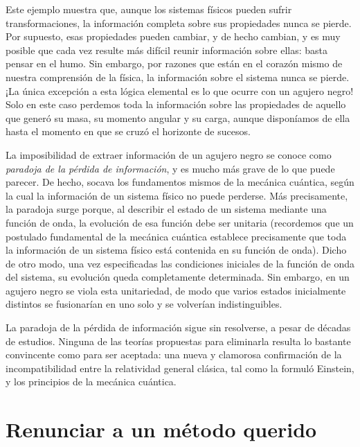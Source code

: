 Este ejemplo muestra que, aunque los sistemas físicos pueden sufrir transformaciones, la información completa sobre sus propiedades nunca se pierde. Por supuesto, esas propiedades pueden cambiar, y de hecho cambian, y es muy posible que cada vez resulte más difícil reunir información sobre ellas: basta pensar en el humo. Sin embargo, por razones que están en el corazón mismo de nuestra comprensión de la física, la información sobre el sistema nunca se pierde. ¡La única excepción a esta lógica elemental es lo que ocurre con un agujero negro! Solo en este caso perdemos toda la información sobre las propiedades de aquello que generó su masa, su momento angular y su carga, aunque disponíamos de ella hasta el momento en que se cruzó el horizonte de sucesos.

La imposibilidad de extraer información de un agujero negro se conoce como \emph{paradoja de la pérdida de información}, y es mucho más grave de lo que puede parecer. De hecho, socava los fundamentos mismos de la mecánica cuántica, según la cual la información de un sistema físico no puede perderse. Más precisamente, la paradoja surge porque, al describir el estado de un sistema mediante una función de onda, la evolución de esa función debe ser unitaria (recordemos que un postulado fundamental de la mecánica cuántica establece precisamente que toda la información de un sistema físico está contenida en su función de onda). Dicho de otro modo, una vez especificadas las condiciones iniciales de la función de onda del sistema, su evolución queda completamente determinada. Sin embargo, en un agujero negro se viola esta unitariedad, de modo que varios estados inicialmente distintos se fusionarían en uno solo y se volverían indistinguibles.

La paradoja de la pérdida de información sigue sin resolverse, a pesar de décadas de estudios. Ninguna de las teorías propuestas para eliminarla resulta lo bastante convincente como para ser aceptada: una nueva y clamorosa confirmación de la incompatibilidad entre la relatividad general clásica, tal como la formuló Einstein, y los principios de la mecánica cuántica.

\section{Renunciar a un método querido}\label{sec:06-method}

